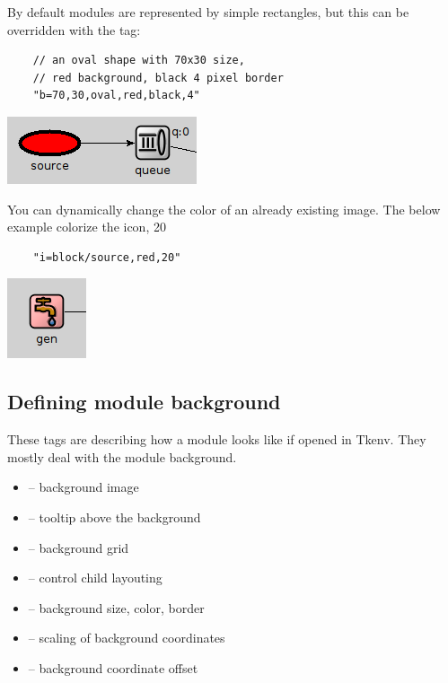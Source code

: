 By default modules are represented by simple rectangles, but this can
be overridden with the  tag:
\begin{verbatim}
    // an oval shape with 70x30 size, 
    // red background, black 4 pixel border 
    "b=70,30,oval,red,black,4"
\end{verbatim}

\begin{center}
\includegraphics{figures/graphics-btag}
\end{center}

You can dynamically change the color of an already existing image.
The below example colorize the  icon, 20%
\begin{verbatim}
    "i=block/source,red,20"
\end{verbatim}

\begin{center}
\includegraphics{figures/graphics-itag}
\end{center}

\subsection{Defining module background}

These tags are describing how a module looks like if opened in 
Tkenv. They mostly deal with the module background.

\begin{itemize}
  \item{ -- background image}
  \item{ -- tooltip above the background}
  \item{ -- background grid}
  \item{ -- control child layouting}
  \item{ -- background size, color, border}
  \item{ -- scaling of background coordinates}
  \item{ -- background coordinate offset}
\end{itemize}

